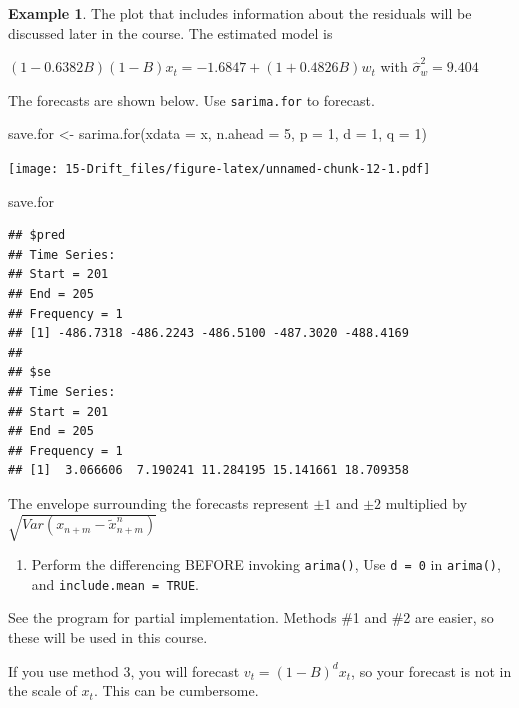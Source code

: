 \documentclass[
]{book}
\newenvironment{Shaded}{\begin{snugshade}}{\end{snugshade}}
\newcommand{\AttributeTok}[1]{\textcolor[rgb]{0.77,0.63,0.00}{#1}}
\newcommand{\DecValTok}[1]{\textcolor[rgb]{0.00,0.00,0.81}{#1}}
\newcommand{\FunctionTok}[1]{\textcolor[rgb]{0.00,0.00,0.00}{#1}}
\newcommand{\NormalTok}[1]{#1}
\newcommand{\OtherTok}[1]{\textcolor[rgb]{0.56,0.35,0.01}{#1}}
\providecommand{\tightlist}{%
  \setlength{\itemsep}{0pt}\setlength{\parskip}{0pt}}
\theoremstyle{definition}
\theoremstyle{definition}
\newtheorem{example}{Example}[chapter]
\theoremstyle{definition}
\theoremstyle{definition}
\theoremstyle{remark}
\begin{document}
\begin{example}
The plot that includes information about the residuals will be discussed later in the course. The estimated model is

\((1 - 0.6382B)(1 - B)x_t = -1.6847 + (1 + 0.4826B)w_t\) with \(\hat \sigma_w^2=9.404\)

The forecasts are shown below. Use \texttt{sarima.for} to forecast.

\begin{Shaded}
\begin{Highlighting}[]
\NormalTok{save.for }\OtherTok{\textless{}{-}} \FunctionTok{sarima.for}\NormalTok{(}\AttributeTok{xdata =}\NormalTok{ x, }\AttributeTok{n.ahead =} \DecValTok{5}\NormalTok{, }\AttributeTok{p =} \DecValTok{1}\NormalTok{, d }
    \OtherTok{=} \DecValTok{1}\NormalTok{, }\AttributeTok{q =} \DecValTok{1}\NormalTok{)  }
\end{Highlighting}
\end{Shaded}

\texttt{[image: 15-Drift\_files/figure-latex/unnamed-chunk-12-1.pdf]}

\begin{Shaded}
\begin{Highlighting}[]
\NormalTok{save.for}
\end{Highlighting}
\end{Shaded}

\begin{verbatim}
## $pred
## Time Series:
## Start = 201 
## End = 205 
## Frequency = 1 
## [1] -486.7318 -486.2243 -486.5100 -487.3020 -488.4169
## 
## $se
## Time Series:
## Start = 201 
## End = 205 
## Frequency = 1 
## [1]  3.066606  7.190241 11.284195 15.141661 18.709358
\end{verbatim}

The envelope surrounding the forecasts represent \(\pm 1\) and \(\pm 2\) multiplied by \(\sqrt{Var(x_{n+m}-\tilde x^n_{n+m})}\)

\begin{enumerate}
\def\labelenumi{\arabic{enumi}.}
\setcounter{enumi}{2}
\tightlist
\item
  Perform the differencing BEFORE invoking \texttt{arima()}, Use \texttt{d\ =\ 0} in \texttt{arima()}, and \texttt{include.mean\ =\ TRUE}.
\end{enumerate}

See the program for partial implementation. Methods \#1 and \#2 are easier, so these will be used in this course.

If you use method 3, you will forecast \(v_t=(1-B)^dx_t\), so your forecast is not in the scale of \(x_t\). This can be cumbersome.


\end{example}
\end{document}

